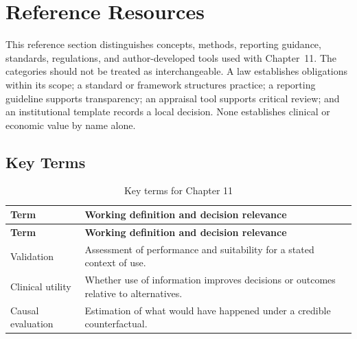 \section{Reference Resources}
\label{sec:comp-ch11-reference}

This reference section distinguishes concepts, methods, reporting guidance,
standards, regulations, and author-developed tools used with Chapter~11. The
categories should not be treated as interchangeable. A law establishes obligations
within its scope; a standard or framework structures practice; a reporting guideline
supports transparency; an appraisal tool supports critical review; and an
institutional template records a local decision. None establishes clinical or
economic value by name alone. 

\subsection{Key Terms}
\begin{longtable}{@{}p{}p{}@{}}
\caption{Key terms for Chapter 11}
\label{tab:comp-ch11-key-terms}\\
\toprule
\textbf{Term} & \textbf{Working definition and decision relevance} \\
\midrule
\endfirsthead
\toprule
\textbf{Term} & \textbf{Working definition and decision relevance} \\
\midrule
\endhead
\bottomrule
\endlastfoot
Validation & Assessment of performance and suitability for a stated context of use. \\
Clinical utility & Whether use of information improves decisions or outcomes relative to alternatives. \\
Causal evaluation & Estimation of what would have happened under a credible counterfactual. \\
\end{longtable}


